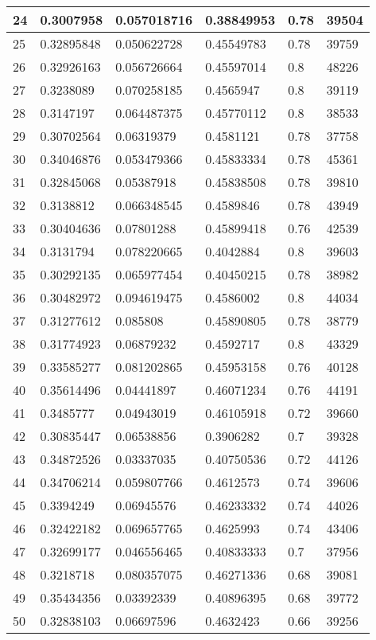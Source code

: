 \begin{longtable}{|l|l|l|l|l|l|}
24 & 0.3007958 & 0.057018716 & 0.38849953 & 0.78 & 39504 \\ \hline 
25 & 0.32895848 & 0.050622728 & 0.45549783 & 0.78 & 39759 \\ \hline 
26 & 0.32926163 & 0.056726664 & 0.45597014 & 0.8 & 48226 \\ \hline 
27 & 0.3238089 & 0.070258185 & 0.4565947 & 0.8 & 39119 \\ \hline 
28 & 0.3147197 & 0.064487375 & 0.45770112 & 0.8 & 38533 \\ \hline 
29 & 0.30702564 & 0.06319379 & 0.4581121 & 0.78 & 37758 \\ \hline 
30 & 0.34046876 & 0.053479366 & 0.45833334 & 0.78 & 45361 \\ \hline 
31 & 0.32845068 & 0.05387918 & 0.45838508 & 0.78 & 39810 \\ \hline 
32 & 0.3138812 & 0.066348545 & 0.4589846 & 0.78 & 43949 \\ \hline 
33 & 0.30404636 & 0.07801288 & 0.45899418 & 0.76 & 42539 \\ \hline 
34 & 0.3131794 & 0.078220665 & 0.4042884 & 0.8 & 39603 \\ \hline 
35 & 0.30292135 & 0.065977454 & 0.40450215 & 0.78 & 38982 \\ \hline 
36 & 0.30482972 & 0.094619475 & 0.4586002 & 0.8 & 44034 \\ \hline 
37 & 0.31277612 & 0.085808 & 0.45890805 & 0.78 & 38779 \\ \hline 
38 & 0.31774923 & 0.06879232 & 0.4592717 & 0.8 & 43329 \\ \hline 
39 & 0.33585277 & 0.081202865 & 0.45953158 & 0.76 & 40128 \\ \hline 
40 & 0.35614496 & 0.04441897 & 0.46071234 & 0.76 & 44191 \\ \hline 
41 & 0.3485777 & 0.04943019 & 0.46105918 & 0.72 & 39660 \\ \hline 
42 & 0.30835447 & 0.06538856 & 0.3906282 & 0.7 & 39328 \\ \hline 
43 & 0.34872526 & 0.03337035 & 0.40750536 & 0.72 & 44126 \\ \hline 
44 & 0.34706214 & 0.059807766 & 0.4612573 & 0.74 & 39606 \\ \hline 
45 & 0.3394249 & 0.06945576 & 0.46233332 & 0.74 & 44026 \\ \hline 
46 & 0.32422182 & 0.069657765 & 0.4625993 & 0.74 & 43406 \\ \hline 
47 & 0.32699177 & 0.046556465 & 0.40833333 & 0.7 & 37956 \\ \hline 
48 & 0.3218718 & 0.080357075 & 0.46271336 & 0.68 & 39081 \\ \hline 
49 & 0.35434356 & 0.03392339 & 0.40896395 & 0.68 & 39772 \\ \hline 
50 & 0.32838103 & 0.06697596 & 0.4632423 & 0.66 & 39256 \\ \hline 
\end{longtable}